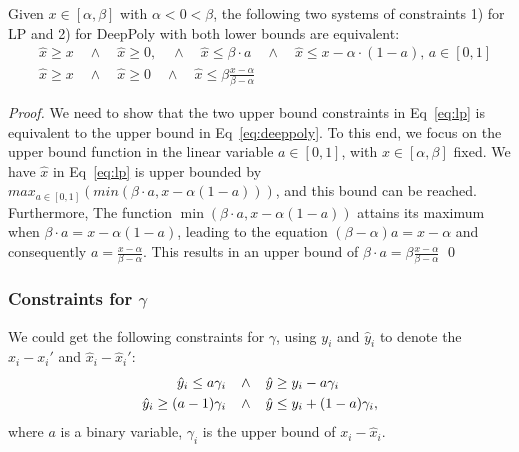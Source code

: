 \begin{proposition}
	\label{LP}
	Given $x \in [\alpha,\beta]$ with $\alpha < 0 < \beta$, the following two systems of constraints 
	1) for LP and 2) for DeepPoly with both lower bounds are equivalent:
	\begin{align}
& \hat{x} \geq x \quad \wedge \quad \hat{x} \geq 0, \quad \wedge \quad \hat{x} \leq \beta \cdot a \quad \wedge \quad \hat{x} \leq x-\alpha \cdot (1-a), \, a \in [0,1]  \label{eq:lp}\\
&\hat{x} \geq x \quad \wedge \quad \hat{x} \geq 0 \quad \wedge \quad \hat{x} \leq \beta \frac{x-\alpha}{\beta-\alpha} \label{eq:deeppoly}
	\end{align} 
\end{proposition}

\begin{proof}
We need to show that the two upper bound constraints in Eq~\ref{eq:lp} is equivalent to the upper bound in Eq~\ref{eq:deeppoly}. To this end, we focus on the upper bound function in the linear variable $a \in  [0,1]$, with $x \in [\alpha,\beta]$ fixed. We have $\hat{x}$ in Eq~\ref{eq:lp} is upper bounded by $max_{a \in [0,1]} (min(\beta \cdot a, x - \alpha (1-a)))$, and this bound can be reached. Furthermore, 
	The function $\min(\beta \cdot a, x - \alpha (1-a))$ attains its maximum when $\beta \cdot a = x - \alpha (1-a)$, leading to the equation $(\beta - \alpha) a = x - \alpha$ and consequently $a = \frac{x - \alpha}{\beta-\alpha}$. This results in an upper bound of $\beta \cdot a = \beta \frac{x - \alpha}{\beta-\alpha}$ \qed
\end{proof}

\subsubsection*{Constraints for $\gamma$}

We could get the following constraints for $\gamma$, using $y_i$ and $\hat{y}_i$ to denote the $x_i-x_i'$ and $\hat{x}_i-\hat{x}_i'$:\begin{align*}
	\hat{y}_i \leq a \gamma_i \hspace*{2ex} &\wedge \hspace*{2ex}\hat{y} \geq y_i - a \gamma_i\\
	\hat{y}_i \geq (a-1) \gamma_i  \hspace*{2ex} &\wedge \hspace*{2ex} \hat{y} \leq y_i + (1-a) \gamma_i,
\end{align*} where $a$ is a binary variable, $\gamma_i$ is the upper bound of $x_i-\hat{x}_i$.

